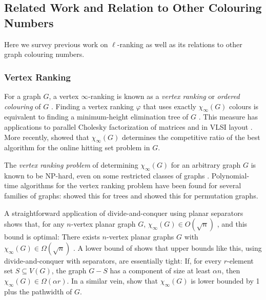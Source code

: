 \documentclass[kpfonts]{patmorin}
\theoremstyle{named}
\begin{document}
\subsection{Related Work and Relation to Other Colouring Numbers}

Here we survey previous work on $\ell$-ranking as well as its relations to other graph colouring numbers.

\subsubsection{Vertex Ranking}

For a graph $G$, a vertex $\infty$-ranking is known as a \emph{vertex ranking} \cite{bodlaender.deogun.ea:rankings} or \emph{ordered colouring} of $G$ \cite{katchalski.mccuaig.ea:ordered}.  Finding a vertex ranking $\varphi$ that uses exactly $\chi_\infty(G)$ colours is equivalent to finding a minimum-height elimination tree of $G$ \cite{torre.greenlaw.ea:optimal,deogun.kloks.ea:on}.  This measure has applications to parallel Cholesky factorization of matrices \cite{bodlaender.gilbert.ea:approximating,duff.reid:multifrontal,liu:role,dereniowski.kubale:cholesky} and in VLSI layout \cite{leiserson:area,sen.deng.ea:on}.  More recently, \citet{even.smorodinsky:hitting} showed that $\chi_\infty(G)$ determines the competitive ratio of the best algorithm for the online hitting set problem in $G$.

The \emph{vertex ranking problem} of determining $\chi_\infty(G)$ for an arbitrary graph $G$ is known to be NP-hard, even on some restricted classes of graphs \cite{bodlaender.deogun.ea:rankings,llewellyn.tovey.ea:local,llewellyn.tovey.ea:erratum,dereniowski.nadolski:vertex}. Polynomial-time algorithms for the vertex ranking problem have been found for several families of graphs: \citet{schaeffer:optimal,iyer.ratliff.ea:optimal} showed this for trees and \citet{deogun.kloks.ea:on} showed this for permutation graphs.

A straightforward application of divide-and-conquer using planar separators shows that, for any $n$-vertex planar graph $G$, $\chi_\infty(G) \in O(\sqrt{n})$ \cite{llewellyn.tovey.ea:local,katchalski.mccuaig.ea:ordered}, and this bound is optimal:  There exists $n$-vertex planar graphs $G$ with $\chi_\infty(G)\in \Omega(\sqrt{n})$ \cite{katchalski.mccuaig.ea:ordered}.  A lower bound of \citet{katchalski.mccuaig.ea:ordered} shows that upper bounds like this, using divide-and-conquer with separators, are essentially tight: If, for every $r$-element set $S\subseteq V(G)$, the graph $G-S$ has a component of size at least $\alpha n$, then $\chi_\infty(G) \in\Omega(\alpha r)$. In a similar vein, \citet{bodlaender.gilbert.ea:approximating,kloks:treewidth} show that $\chi_\infty(G)$ is lower bounded by 1 plus the pathwidth of $G$.
\end{document}
